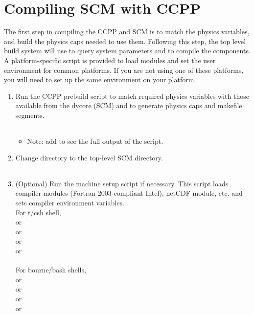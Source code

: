 \section{Compiling SCM with CCPP}
\label{section: compiling}

The first step in compiling the CCPP and SCM is to match the physics variables, and build the physics caps needed to use them.  Following this step, the top level build system will use  to query system parameters and  to compile the components.  A platform-specific script is provided to load modules and set the user environment for common platforms.  If you are not using one of these platforms, you will need to set up the same environment on your platform.

\begin{enumerate}
	\item Run the CCPP prebuild script to match required physics variables with those available from the dycore (SCM) and to generate physics caps and makefile segments.\\
  		\\
  		\begin{itemize}
  			\item Note: add  to see the full output of the script.\\
		\end{itemize}

	\item Change directory to the top-level SCM directory.\\
  		 \\
	\item (Optional) Run the machine setup script if necessary. This script loads compiler modules (Fortran 2003-compliant Intel), netCDF module, etc. and sets compiler environment variables.  \\
For t/csh shell, \\
  		 or\\
 		 or\\
		 or\\
		 or\\
		\\

For bourne/bash shells,\\
   or\\
   or\\
   or\\
   or\\
  \\
  

\end{enumerate}
